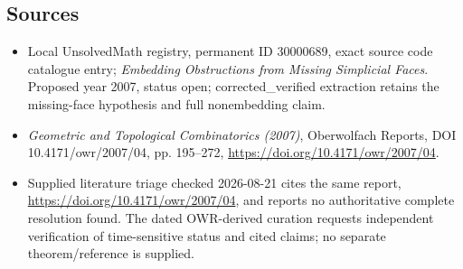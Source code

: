 \documentclass[11pt]{article}
\begin{document}
\subsection{Sources}
\begin{itemize}
\item Local UnsolvedMath registry, permanent ID 30000689, exact source code catalogue entry; \emph{Embedding Obstructions from Missing Simplicial Faces}. Proposed year 2007, status open; corrected\_verified extraction retains the missing-face hypothesis and full nonembedding claim.
\item \emph{Geometric and Topological Combinatorics (2007)}, Oberwolfach Reports, DOI 10.4171/owr/2007/04, pp. 195--272, \url{https://doi.org/10.4171/owr/2007/04}.
\item Supplied literature triage checked 2026-08-21 cites the same report, \url{https://doi.org/10.4171/owr/2007/04}, and reports no authoritative complete resolution found. The dated OWR-derived curation requests independent verification of time-sensitive status and cited claims; no separate theorem/reference is supplied.
\end{itemize}
\end{document}
